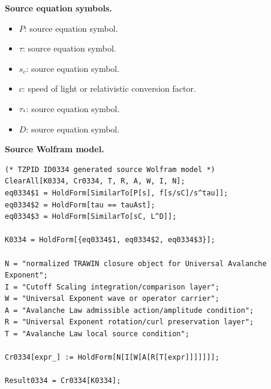 \begin{minipage}[t]{0.49\linewidth}
\begingroup
\small
\raggedright
\textbf{Source equation symbols.}\par
\begin{itemize}[leftmargin=1.35em,itemsep=1pt,topsep=1pt,parsep=0pt]
    \item $P$: source equation symbol.
    \item $\tau$: source equation symbol.
    \item $s_{c}$: source equation symbol.
    \item $c$: speed of light or relativistic conversion factor.
    \item $\tau_{\ast}$: source equation symbol.
    \item $D$: source equation symbol.
\end{itemize}
\endgroup
\end{minipage}\hfill
\begin{minipage}[t]{0.47\linewidth}
\begingroup
\scriptsize
\raggedright
\textbf{Source Wolfram model.}\par
\begin{Verbatim}[fontsize=\tiny,breaklines=true,breakanywhere=true]
(* TZPID ID0334 generated source Wolfram model *)
ClearAll[K0334, Cr0334, T, R, A, W, I, N];
eq0334$1 = HoldForm[SimilarTo[P[s], f[s/sC]/s^tau]];
eq0334$2 = HoldForm[tau == tauAst];
eq0334$3 = HoldForm[SimilarTo[sC, L^D]];

K0334 = HoldForm[{eq0334$1, eq0334$2, eq0334$3}];

N = "normalized TRAWIN closure object for Universal Avalanche Exponent";
I = "Cutoff Scaling integration/comparison layer";
W = "Universal Exponent wave or operator carrier";
A = "Avalanche Law admissible action/amplitude condition";
R = "Universal Exponent rotation/curl preservation layer";
T = "Avalanche Law local source condition";

Cr0334[expr_] := HoldForm[N[I[W[A[R[T[expr]]]]]]];

Result0334 = Cr0334[K0334];
\end{Verbatim}
\endgroup
\end{minipage}

